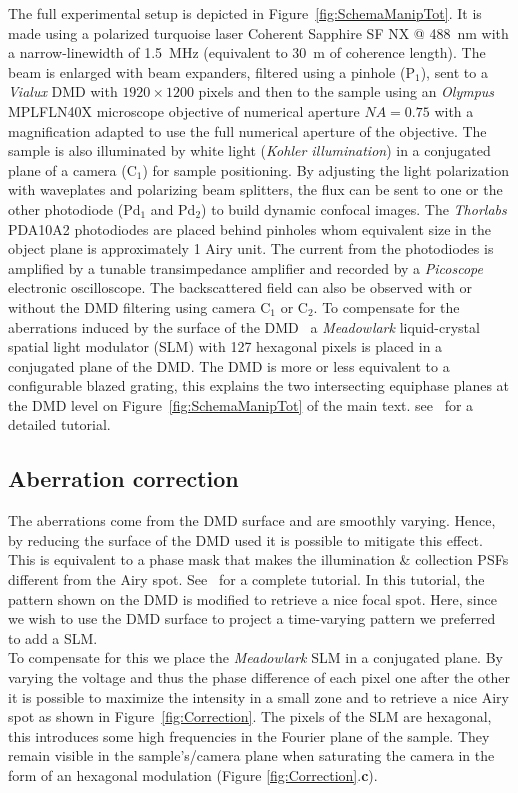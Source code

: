 \documentclass[%
reprint,
 amsmath,amssymb,
 aps,
]{revtex4-2}
\begin{document}
The full experimental setup is depicted in Figure~\ref{fig:SchemaManipTot}. It is made using a polarized turquoise laser Coherent Sapphire SF NX @ 488~nm with a narrow-linewidth of 1.5~MHz (equivalent to 30~m of coherence length). The beam is enlarged with  beam expanders, filtered using a pinhole (P$_1$), sent to a \textit{Vialux} DMD with $1920 \times 1200$ pixels and then to the sample using an \textit{Olympus} MPLFLN40X microscope objective of numerical aperture $N\!A=0.75$ with a magnification adapted to use the full numerical aperture of the objective. The sample is also illuminated by white light (\textit{Kohler illumination}) in a conjugated plane of a camera (C$_1$) for sample positioning. By adjusting the light polarization with waveplates and polarizing beam splitters, the flux can be sent to one or the other photodiode (Pd$_1$ and Pd$_2$) to build dynamic confocal images. The \textit{Thorlabs} PDA10A2 photodiodes are placed behind pinholes whom equivalent size in the object plane is approximately 1 Airy unit. The current from the photodiodes is amplified by a tunable transimpedance amplifier and recorded by a  \textit{Picoscope} electronic oscilloscope. The backscattered field can also be observed with or without the DMD filtering using camera C$_1$ or C$_2$. To compensate for the aberrations induced by the surface of the DMD~\cite{DMDsetting} a \textit{Meadowlark} liquid-crystal spatial light modulator (SLM) with 127 hexagonal pixels is placed in a conjugated plane of the DMD. %
The DMD is more or less equivalent to a configurable blazed grating, this explains the two intersecting equiphase planes at the DMD level on Figure~\ref{fig:SchemaManipTot} of the main text. see~\cite{DMDsetting} for a detailed tutorial.\\


\subsection{Aberration correction}

The aberrations come from the DMD surface and are smoothly varying. Hence, by reducing the surface of the DMD used it is possible to mitigate this effect. This is equivalent to a phase mask that makes the illumination \& collection PSFs different from the Airy spot.
See~\cite{DMDab} for a complete tutorial. In this tutorial, the pattern shown on the DMD is modified to retrieve a nice focal spot. Here, since we wish to use the DMD surface to project a time-varying pattern we preferred to add a SLM.\\
To compensate for this we place the \textit{Meadowlark} SLM in a conjugated plane. By varying the voltage and thus the phase difference of each pixel one after the other it is possible to maximize the intensity in a small zone and to retrieve a nice Airy spot as shown in Figure~\ref{fig:Correction}. The pixels of the SLM are hexagonal, this introduces some high frequencies in the Fourier plane of the sample. They remain visible in the sample's/camera plane when saturating the camera in the form of an hexagonal modulation (Figure \ref{fig:Correction}.\textbf{c}). 
\end{document}
